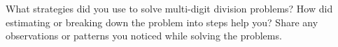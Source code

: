 \documentclass[12pt]{article}
\begin{document}
\begin{tcolorbox}[colframe=black!60, colback=white, 
coltitle=black, colbacktitle=black!15, fonttitle=\bfseries\Large, 
title=Reflection, halign title=center, left=10pt, right=10pt, top=10pt, bottom=80pt]
What strategies did you use to solve multi-digit division problems? How did estimating or breaking down the problem into steps help you? Share any observations or patterns you noticed while solving the problems.
\end{tcolorbox}
\end{document}
